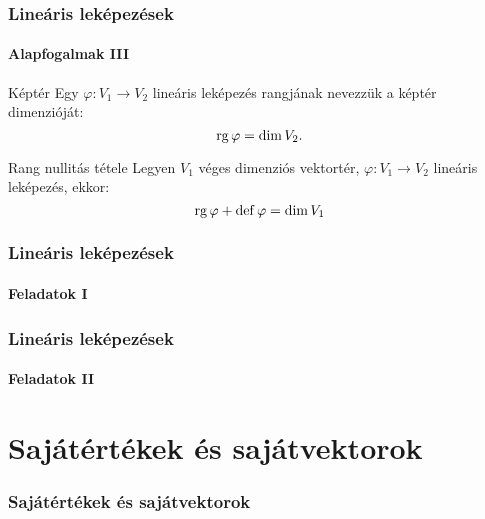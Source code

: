 \documentclass[xcolor={table}]{beamer}
\begin{document}
\begin{frame}
  \frametitle{Lineáris leképezések}
  \framesubtitle{Alapfogalmak III}

  \vfill
  \begin{block}{Képtér}
    Egy $\varphi: V_1 \rightarrow V_2$ lineáris leképezés rangjának nevezzük
    a képtér dimenzióját:
    \[
      \operatorname{rg} \varphi = \operatorname{dim} V_2
      \text.
    \]
  \end{block}
  \vfill
  \begin{block}{Rang nullitás tétele}
    Legyen $V_1$ véges dimenziós vektortér, $\varphi: V_1 \rightarrow V_2$
    lineáris leképezés, ekkor:
    \[
      \operatorname{rg} \varphi + \operatorname{def} \varphi = \operatorname{dim} V_1
    \]
  \end{block}
  \vfill
\end{frame}

\begin{frame}
  \frametitle{Lineáris leképezések}
  \framesubtitle{Feladatok I}

  
\end{frame}

\begin{frame}
  \frametitle{Lineáris leképezések}
  \framesubtitle{Feladatok II}

  
\end{frame}

\section{Sajátértékek és sajátvektorok}
\begin{frame}
  \frametitle{Sajátértékek és sajátvektorok}
\end{frame}
\end{document}
